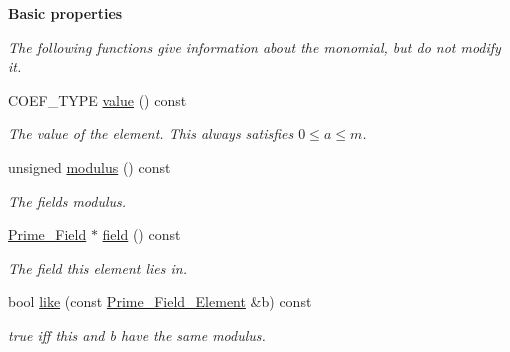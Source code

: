 \begin{Indent}\textbf{ Basic properties}\par
{\em The following functions give information about the monomial, but do not modify it. }\begin{DoxyCompactItemize}
\item 
\mbox{\label{class_prime___field___element_aa9c68761643afa0b22863904bdfe7e83}} 
C\+O\+E\+F\+\_\+\+T\+Y\+PE \hyperlink{class_prime___field___element_aa9c68761643afa0b22863904bdfe7e83}{value} () const
\begin{DoxyCompactList}\small\item\em The value of the element. This always satisfies $0\leq a\leq m$. \end{DoxyCompactList}\item 
\mbox{\label{class_prime___field___element_a4c003344235901132386663a9f28ac1d}} 
unsigned \hyperlink{class_prime___field___element_a4c003344235901132386663a9f28ac1d}{modulus} () const
\begin{DoxyCompactList}\small\item\em The field\textquotesingle{}s modulus. \end{DoxyCompactList}\item 
\mbox{\label{class_prime___field___element_af9641451c05d26a2016e21a6ef054c40}} 
\hyperlink{class_prime___field}{Prime\+\_\+\+Field} $\ast$ \hyperlink{class_prime___field___element_af9641451c05d26a2016e21a6ef054c40}{field} () const
\begin{DoxyCompactList}\small\item\em The field this element lies in. \end{DoxyCompactList}\item 
\mbox{\label{class_prime___field___element_a0d75c69f785c122bf9b3b803c22393dc}} 
bool \hyperlink{class_prime___field___element_a0d75c69f785c122bf9b3b803c22393dc}{like} (const \hyperlink{class_prime___field___element}{Prime\+\_\+\+Field\+\_\+\+Element} \&b) const
\begin{DoxyCompactList}\small\item\em {\ttfamily true} iff {\ttfamily this} and {\ttfamily b} have the same modulus. \end{DoxyCompactList}\item 

\end{DoxyCompactItemize}
\end{Indent}
